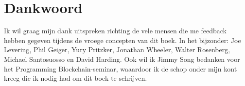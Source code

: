 
\chapter*{Dankwoord}

\vspace{-3\baselineskip}

Ik wil graag mijn dank uitspreken richting de vele mensen die me feedback hebben gegeven tijdens de vroege concepten van dit boek. In het bijzonder: Joe Levering, Phil Geiger, Yury Pritzker, Jonathan Wheeler, Walter Rosenberg, Michael Santosuosso en David Harding. Ook wil ik Jimmy Song bedanken voor het Programming Blockchain-seminar, waaardoor ik de schop onder mijn kont kreeg die ik nodig had om dit boek te schrijven.
